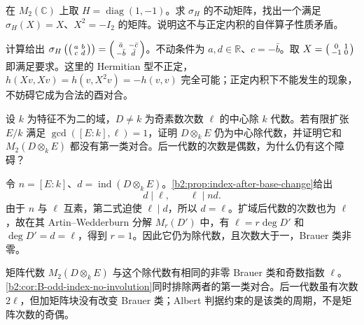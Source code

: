\begin{exercise}\label{b2:ex:B-indefinite-unitary}
	在 \(M_2(\mathbb C)\) 上取 \(H=\operatorname{diag}(1,-1)\)。求 \(\sigma_H\) 的不动矩阵，找出一个满足 \(\sigma_H(X)=X\)、\(X^2=-I_2\) 的矩阵。说明这不与正定内积的自伴算子性质矛盾。
\end{exercise}
\begin{solution}
	计算给出 \(\sigma_H\left(\begin{psmallmatrix}a&b\\c&d\end{psmallmatrix}\right)=\begin{psmallmatrix}\bar a&-\bar c\\-\bar b&\bar d\end{psmallmatrix}\)。不动条件为 \(a,d\in\mathbb R\)、\(c=-\bar b\)。取 \(X=\begin{psmallmatrix}0&1\\-1&0\end{psmallmatrix}\) 即满足要求。这里的 Hermitian 型不正定，\(h(Xv,Xv)=h(v,X^2v)=-h(v,v)\) 完全可能；正定内积下不能发生的现象，不妨碍它成为合法的酉对合。
\end{solution}

\begin{exercise}\label{b2:ex:B-no-odd-division-involution}
	设 \(k\) 为特征不为二的域，\(D\ne k\) 为奇素数次数 \(\ell\) 的中心除 \(k\) 代数。若有限扩张 \(E/k\) 满足 \(\gcd([E:k],\ell)=1\)，证明 \(D\otimes_kE\) 仍为中心除代数，并证明它和 \(M_2(D\otimes_kE)\) 都没有第一类对合。后一代数的次数是偶数，为什么仍有这个障碍？
\end{exercise}
\begin{solution}
	令 \(n=[E:k]\)、\(d=\operatorname{ind}(D\otimes_kE)\)。\cref{b2:prop:index-after-base-change}给出
	\[
		d\mid\ell,\qquad \ell\mid nd.
	\]
	由于 \(n\) 与 \(\ell\) 互素，第二式迫使 \(\ell\mid d\)，所以 \(d=\ell\)。扩域后代数的次数也为 \(\ell\)，故在其 Artin--Wedderburn 分解 \(M_r(D')\) 中，有 \(\ell=r\deg D'\) 和 \(\deg D'=d=\ell\)，得到 \(r=1\)。因此它仍为除代数，且次数大于一，Brauer 类非零。

	矩阵代数 \(M_2(D\otimes_kE)\) 与这个除代数有相同的非零 Brauer 类和奇数指数 \(\ell\)。\cref{b2:cor:B-odd-index-no-involution}同时排除两者的第一类对合。后一代数虽有次数 \(2\ell\)，但加矩阵块没有改变 Brauer 类；Albert 判据约束的是该类的周期，不是矩阵次数的奇偶。
\end{solution}

